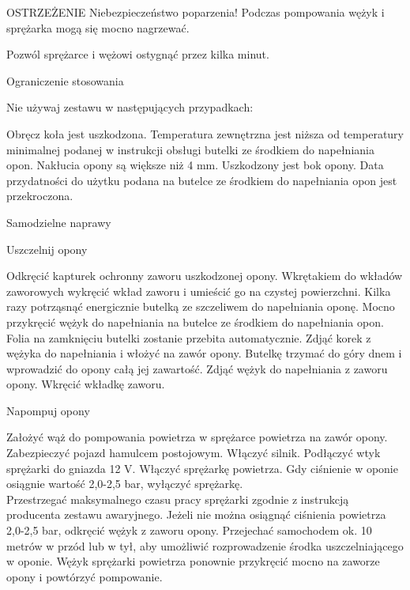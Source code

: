 OSTRZEŻENIE
Niebezpieczeństwo poparzenia!
Podczas pompowania wężyk i sprężarka mogą się mocno nagrzewać.
\begin{itemizeTriangle}
	\itemTriangle Pozwól sprężarce i wężowi ostygnąć przez kilka minut.
\end{itemizeTriangle}

Ograniczenie stosowania

Nie używaj zestawu w następujących przypadkach:
\begin{itemizeTriangle}
	\itemTriangle Obręcz koła jest uszkodzona.
	\itemTriangle Temperatura zewnętrzna jest niższa od temperatury minimalnej podanej w instrukcji obsługi butelki ze środkiem do napełniania opon.
	\itemTriangle Nakłucia opony są większe niż 4 mm.
	\itemTriangle Uszkodzony jest bok opony.
	\itemTriangle Data przydatności do użytku podana na butelce ze środkiem do napełniania opon jest przekroczona.
\end{itemizeTriangle}

Samodzielne naprawy

Uszczelnij opony
\begin{itemizeArrow}
	\itemArrow Odkręcić kapturek ochronny zaworu uszkodzonej opony.
	\itemArrow Wkrętakiem do wkładów zaworowych wykręcić wkład zaworu i umieścić go na czystej powierzchni.
	\itemArrow Kilka razy potrząsnąć energicznie butelką ze szczeliwem do napełniania oponę.
	\itemArrow Mocno przykręcić wężyk do napełniania na butelce ze środkiem do napełniania opon. Folia na zamknięciu butelki zostanie przebita automatycznie.
	\itemArrow Zdjąć korek z wężyka do napełniania i włożyć na zawór opony.
	\itemArrow Butelkę trzymać do góry dnem i wprowadzić do opony całą jej zawartość.
	\itemArrow Zdjąć wężyk do napełniania z zaworu opony.
	\itemArrow Wkręcić wkładkę zaworu.
\end{itemizeArrow}

Napompuj opony
\begin{itemizeArrow}
	\itemArrow Założyć wąż do pompowania powietrza w sprężarce powietrza na zawór opony.
	\itemArrow Zabezpieczyć pojazd hamulcem postojowym.
	\itemArrow Włączyć silnik.
	\itemArrow Podłączyć wtyk sprężarki do gniazda 12 V.
	\itemArrow Włączyć sprężarkę powietrza.
	\itemArrow Gdy ciśnienie w oponie osiągnie wartość 2,0-2,5 bar, wyłączyć sprężarkę. \\ Przestrzegać maksymalnego czasu pracy sprężarki zgodnie z instrukcją producenta zestawu awaryjnego.
	\itemArrow Jeżeli nie można osiągnąć ciśnienia powietrza 2,0-2,5 bar, odkręcić wężyk z zaworu opony.
	\itemArrow Przejechać samochodem ok. 10 metrów w przód lub w tył, aby umożliwić rozprowadzenie środka uszczelniającego w oponie.
	\itemArrow Wężyk sprężarki powietrza ponownie przykręcić mocno na zaworze opony i powtórzyć pompowanie.
\end{itemizeArrow}

